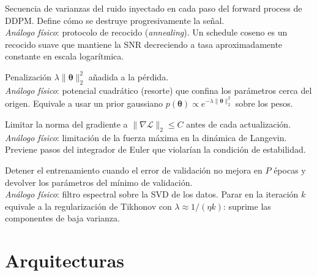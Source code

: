 \begin{description}[leftmargin=0pt, labelwidth=!, labelsep=1em,
  font=\normalfont\bfseries, style=nextline]
\item[Noise schedule $\{\beta_t\}$]
Secuencia de varianzas del ruido inyectado en cada paso del forward process
de DDPM. Define cómo se destruye progresivamente la señal.\\
\emph{Análogo físico}: protocolo de recocido (\textit{annealing}).
Un schedule coseno es un recocido suave que mantiene la SNR decreciendo a
tasa aproximadamente constante en escala logarítmica.

\item[Weight decay / regularización $\ell_2$]
Penalización $\lambda\|\bm{\theta}\|_2^2$ añadida a la pérdida.\\
\emph{Análogo físico}: potencial cuadrático (resorte) que confina los
parámetros cerca del origen. Equivale a usar un prior gaussiano
$p(\bm{\theta}) \propto e^{-\lambda\|\bm{\theta}\|_2^2}$ sobre los pesos.

\item[Gradient clipping]
Limitar la norma del gradiente a $\|\nabla\mathcal{L}\|_2 \leq C$ antes
de cada actualización.\\
\emph{Análogo físico}: limitación de la fuerza máxima en la dinámica de
Langevin. Previene pasos del integrador de Euler que violarían la condición
de estabilidad.

\item[Early stopping / parada temprana]
Detener el entrenamiento cuando el error de validación no mejora en $P$
épocas y devolver los parámetros del mínimo de validación.\\
\emph{Análogo físico}: filtro espectral sobre la SVD de los datos.
Parar en la iteración $k$ equivale a la regularización de Tikhonov con
$\lambda \approx 1/(\eta k)$: suprime las componentes de baja varianza.

\end{description}

\section*{Arquitecturas}

